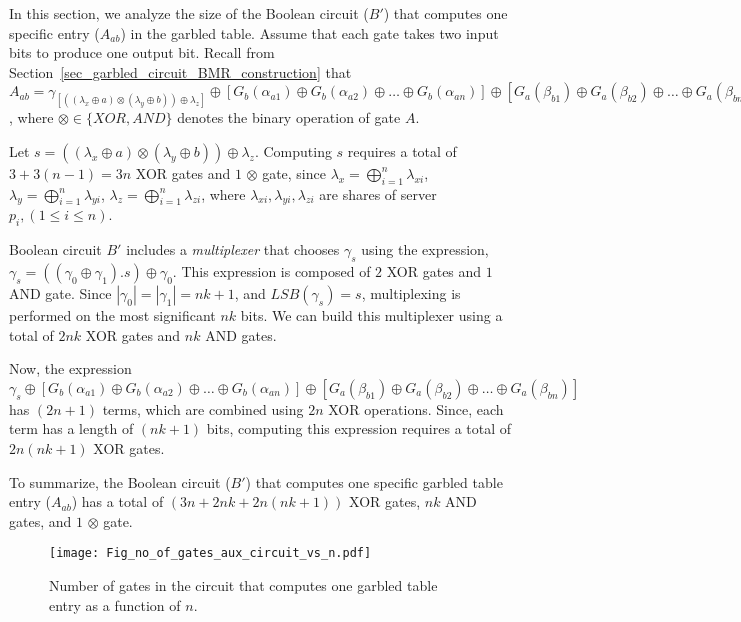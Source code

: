 \documentclass[10pt,journal,cspaper,compsoc]{IEEEtran}
\begin{document}
In this section, we analyze the size of the Boolean circuit ($B'$) that computes one specific entry ($A_{ab}$) in the garbled table. Assume that each gate takes two input bits to produce one output bit. Recall from Section~\ref{sec_garbled_circuit_BMR_construction} that $A_{ab} = \gamma_{[((\lambda_x \oplus a) \otimes (\lambda_y \oplus b)) \oplus \lambda_z]} \oplus [G_b(\alpha_{a1})\oplus G_b(\alpha_{a2})\oplus \ldots \oplus G_b(\alpha_{an})]\oplus [G_a(\beta_{b1})\oplus G_a(\beta_{b2})\oplus \ldots \oplus G_a(\beta_{bn})]$, where $\otimes \in \{XOR,AND\}$ denotes the binary operation of gate $A$.

Let $s = ((\lambda_x \oplus a) \otimes (\lambda_y \oplus b)) \oplus \lambda_z$. Computing $s$ requires a total of $3+3(n-1)=3n$ XOR gates and $1$ $\otimes$ gate, since $\lambda_x = \bigoplus_{i = 1}^{n}\lambda_{xi}$, $\lambda_y = \bigoplus_{i = 1}^{n}\lambda_{yi}$, $\lambda_z = \bigoplus_{i = 1}^{n}\lambda_{zi}$, where $\lambda_{xi}, \lambda_{yi}, \lambda_{zi}$ are shares of server $p_i, (1\le i\le n)$.


Boolean circuit $B'$ includes a {\em multiplexer} that chooses $\gamma_s$ using the expression, $\gamma_s=((\gamma_0\oplus \gamma_1).s)\oplus \gamma_0$. This expression is composed of $2$ XOR gates and $1$ AND gate. Since $|\gamma_0|=|\gamma_1|=nk+1$, and  $LSB(\gamma_s)=s$, multiplexing is performed on the most significant $nk$ bits. We can build this multiplexer using a total of $2nk$ XOR gates and $nk$ AND gates.


Now, the expression $\gamma_s\oplus [G_b(\alpha_{a1})\oplus G_b(\alpha_{a2})\oplus \ldots \oplus G_b(\alpha_{an})]\oplus [G_a(\beta_{b1})\oplus G_a(\beta_{b2})\oplus \ldots \oplus G_a(\beta_{bn})]$ has $(2n+1)$ terms, which are combined using $2n$ XOR operations. Since, each term has a length of $(nk+1)$ bits, computing this expression requires a total of $2n(nk+1)$ XOR gates.


To summarize, the Boolean circuit ($B'$) that computes one specific garbled table entry ($A_{ab}$) has a total of $(3n+2nk+2n(nk+1))$ XOR gates, $nk$ AND gates, and $1$ $\otimes$ gate.


\begin{figure}[t]
\centering
\texttt{[image: Fig\_no\_of\_gates\_aux\_circuit\_vs\_n.pdf]}
\vspace{-3 mm}
\caption{Number of gates in the circuit that computes one garbled table entry as a function of $n$.\vspace{-4 mm}}
\label{fig_num_gates_aux_bool_circuit}
\end{figure}
\end{document}
